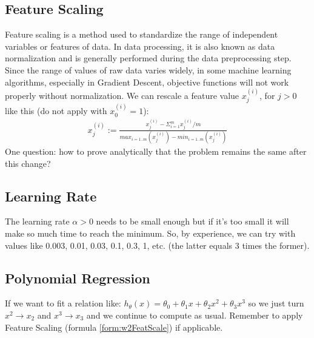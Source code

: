\subsection{Feature Scaling}
Feature scaling is a method used to standardize the range of independent variables or features of data. In data processing, it is also known as data normalization and is generally performed during the data preprocessing step. Since the range of values of raw data varies widely, in some machine learning algorithms, especially in Gradient Descent, objective functions will not work properly without normalization. We can rescale a feature value $x_j^{(i)}$, for $j > 0$ like this (do not apply with $x_0^{(i)} = 1$):
\begin{align}
\label{form:w2FeatScale}
x_j^{(i)} := \frac{x_j^{(i)} - \Sigma_{i=1}^{m} x_j^{(i)}/m}{max_{i=1..m}(x_j^{(i)}) - min_{i=1..m}(x_j^{(i)})} 
\end{align}
One question: how to prove analytically that the problem remains the same after this change?

\subsection{Learning Rate}
The learning rate $\alpha > 0$ needs to be small enough but if it's too small it will make so much time to reach the minimum. So, by experience, we can try with values like 0.003, 0.01, 0.03, 0.1, 0.3, 1, etc. (the latter equals 3 times the former).

\subsection{Polynomial Regression}
If we want to fit a relation like: $h_\theta(x) = \theta_0 + \theta_1 x + \theta_2 x^2 + \theta_3 x^3 $ so we just turn $x^2 \rightarrow x_2$ and $x^3 \rightarrow x_3$ and we continue to compute as usual. Remember to apply Feature Scaling (formula \eqref{form:w2FeatScale}) if applicable.

